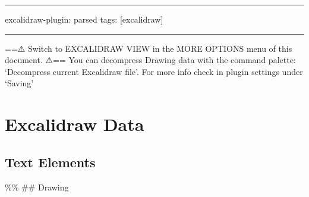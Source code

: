 \documentclass[]{article}
\begin{document}

\begin{center}\rule{0.5\linewidth}{0.5pt}\end{center}

excalidraw-plugin: parsed tags: {[}excalidraw{]}

\begin{center}\rule{0.5\linewidth}{0.5pt}\end{center}

==⚠ Switch to EXCALIDRAW VIEW in the MORE OPTIONS menu of this document.
⚠== You can decompress Drawing data with the command palette:
`Decompress current Excalidraw file'. For more info check in plugin
settings under `Saving'

\hypertarget{excalidraw-data}{%
\section{Excalidraw Data}\label{excalidraw-data}}

\hypertarget{text-elements}{%
\subsection{Text Elements}\label{text-elements}}

\%\% \#\# Drawing
\end{document}
